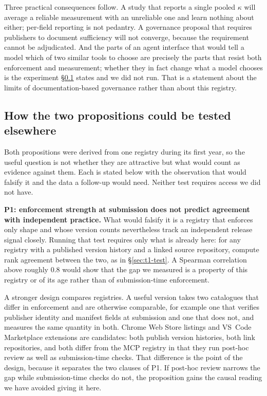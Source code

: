 \documentclass[a4paper,fleqn]{cas-dc}
\begin{document}
Three practical consequences follow. A study that reports a single pooled
$\kappa$ will average a reliable measurement with an unreliable one and learn
nothing about either; per-field reporting is not pedantry. A governance
proposal that requires publishers to document sufficiency will not converge,
because the requirement cannot be adjudicated. And the parts of an agent
interface that would tell a model which of two similar tools to choose are
precisely the parts that resist both enforcement and measurement; whether they
in fact change what a model chooses is the experiment \S\ref{sec:two-propositions}
states and we did not run. That is a statement about the limits of
documentation-based governance rather than about this registry.

\subsection{How the two propositions could be tested elsewhere}\label{sec:two-propositions}

Both propositions were derived from one registry during its first year, so the
useful question is not whether they are attractive but what would count as
evidence against them. Each is stated below with the observation that would
falsify it and the data a follow-up would need. Neither test requires access we
did not have.

\textbf{P1: enforcement strength at submission does not predict agreement with
independent practice.} What would falsify it is a registry that enforces only
shape and whose version counts nevertheless track an independent release signal
closely. Running that test requires only what is already here: for any registry
with a published version history and a linked source repository, compute rank
agreement between the two, as in \S\ref{sec:t1-test}. A Spearman correlation
above roughly 0.8 would show that the gap we measured is a property of this
registry or of its age rather than of submission-time enforcement.

A stronger design compares registries. A useful version takes two catalogues
that differ in enforcement and are otherwise comparable, for example one that
verifies publisher identity and manifest fields at submission and one that does
not, and measures the same quantity in both. Chrome Web Store listings and
VS~Code Marketplace extensions are candidates: both publish version histories,
both link repositories, and both differ from the MCP registry in that they run
post-hoc review as well as submission-time checks. That difference is the point
of the design, because it separates the two clauses of P1. If post-hoc review
narrows the gap while submission-time checks do not, the proposition gains the
causal reading we have avoided giving it here.
\end{document}
